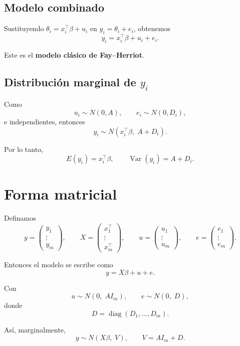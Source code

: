 \subsection{Modelo combinado}

Sustituyendo $\theta_i = x_i^{\top}\beta + u_i$ en $y_i = \theta_i + e_i$, obtenemos
\[
y_i = x_i^{\top}\beta + u_i + e_i.
\]

Este es el \textbf{modelo clásico de Fay--Herriot}.

\subsection{Distribución marginal de $y_i$}

Como
\[
u_i \sim N(0,A), 
\qquad
e_i \sim N(0,D_i),
\]
e independientes, entonces
\[
y_i \sim N(x_i^{\top}\beta,\; A + D_i).
\]

Por lo tanto,
\[
E(y_i)=x_i^{\top}\beta,
\qquad
\operatorname{Var}(y_i)=A+D_i.
\]

\section{Forma matricial}

Definamos
\[
y=
\begin{pmatrix}
y_1\\
\vdots\\
y_m
\end{pmatrix},
\qquad
X=
\begin{pmatrix}
x_1^{\top}\\
\vdots\\
x_m^{\top}
\end{pmatrix},
\qquad
u=
\begin{pmatrix}
u_1\\
\vdots\\
u_m
\end{pmatrix},
\qquad
e=
\begin{pmatrix}
e_1\\
\vdots\\
e_m
\end{pmatrix}.
\]

Entonces el modelo se escribe como
\[
y = X\beta + u + e.
\]

Con
\[
u \sim N(0,\; A I_m),
\qquad
e \sim N(0,\; D),
\]
donde
\[
D = \operatorname{diag}(D_1,\dots,D_m).
\]

Así, marginalmente,
\[
y \sim N(X\beta,\; V),
\qquad
V = A I_m + D.
\]
